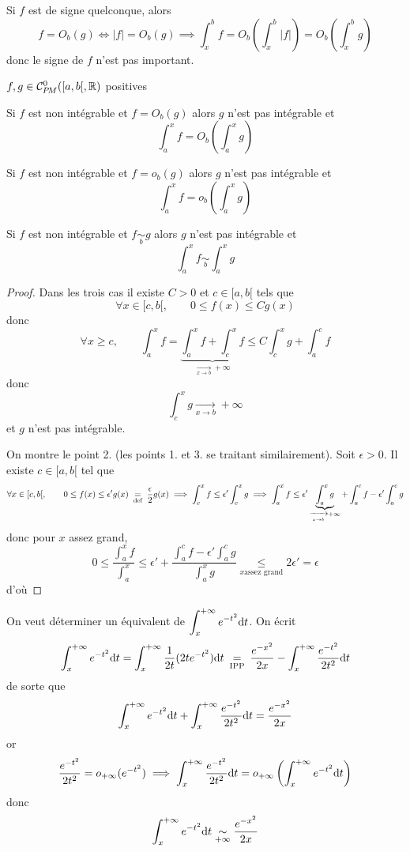 \begin{rem}
    Si $f$ est de signe quelconque, alors \[
        f=O_b(g)\iff |f|=O_b(g) \implies \int_x^bf=O_b \left(\int_x^b|f|\right)=O_b \left( \int_x^bg \right)
    \]
    donc le signe de $f$ n'est pas important.
\end{rem}

\needspace{10cm}
\begin{thm}
    \Hyp $f, g\in\CPM([a, b[, \mathbb R)$ positives
    \begin{concenum}
    \item Si $f$ est non intégrable et $f=O_b(g)$ alors $g$ n'est pas intégrable et \[
            \int_a^xf=O_b \left( \int_a^xg \right)
        \]
    \item Si $f$ est non intégrable et $f=o_b(g)$ alors $g$ n'est pas intégrable et \[
            \int_a^xf=o_b \left( \int_a^xg \right)
        \]
    \item Si $f$ est non intégrable et $f\underset b\sim g$ alors $g$ n'est pas intégrable et \[
            \int_a^xf\underset b\sim \int_a^xg
        \]
    \end{concenum}
\end{thm}

\begin{proof}
    Dans les trois cas il existe $C>0$ et $c\in [a, b[$ tels que \[
        \forall x\in [c, b[, \qquad 0\leq f(x)\leq C g(x)
    \]
    donc \[
        \forall x\geq c, \qquad \int_a^xf=\underbrace{\int_a^xf+\int_c^xf}_{\xrightarrow[x\to b]{}+\infty}\leq C\int_c^xg+\int_a^cf
    \]
    donc \[
        \int_c^xg\xrightarrow[x\to b]{}+\infty
    \]
    et $g$ n'est pas intégrable.

    On montre le point 2. (les points 1. et 3. se traitant similairement). Soit $\epsilon>0$. Il existe $c\in [a, b[$ tel que \[
        \forall x\in [c, b[, \qquad 0\leq f(x)\leq \epsilon'g(x)\;\underset{\text{def}}=\; \frac\epsilon2g(x) \implies \int_c^xf\leq \epsilon'\int_c^xg\implies \int_a^xf\leq \epsilon'\underbrace{\int_a^xg}_{\xrightarrow[x\to b]{}+\infty}+\int_a^cf-\epsilon'\int_a^cg
    \]
    donc pour $x$ assez grand, \[
        0\leq \frac{\displaystyle\int_a^xf}{\displaystyle\int_a^x}\leq \epsilon'+\frac{\displaystyle\int_a^cf-\epsilon'\int_a^cg}{\displaystyle\int_a^xg}\underset{x \text{assez grand}}\leq 2\epsilon'=\epsilon
    \]
    d'où \conc
\end{proof}

\begin{ex}
    On veut déterminer un équivalent de $\displaystyle\int_x^{+\infty}e^{-t^2}\mathrm{d} t$. On écrit \[
        \int_x^{+\infty}e^{-t^2}\mathrm{d} t=\int_x^{+\infty}\frac1{2t}(2te^{-t^2})\mathrm{d} t\underset{\text{\;IPP\;}}=\frac{e^{-x^2}}{2x}-\int_x^{+\infty}\frac{e^{-t^2}}{2t^2}\mathrm{d} t
    \]
    de sorte que \[
        \int_x^{+\infty}e^{-t^2}\mathrm{d} t+\int_x^{+\infty}\frac{e^{-t^2}}{2t^2}\mathrm{d} t=\frac{e^{-x^2}}{2x}
    \]
    or \[
        \frac{e^{-t^2}}{2t^2}=o_{+\infty}(e^{-t^2}) \implies \int_x^{+\infty} \frac{e^{-t^2}}{2t^2}\mathrm{d} t=o_{+\infty} \left( \int_x^{+\infty} e^{-t^2}\mathrm{d} t \right)
    \]
    donc \[
        \int_x^{+\infty}e^{-t^2}\mathrm{d} t\underset{+\infty}\sim\frac{e^{-x^2}}{2x}
    \]
\end{ex}

